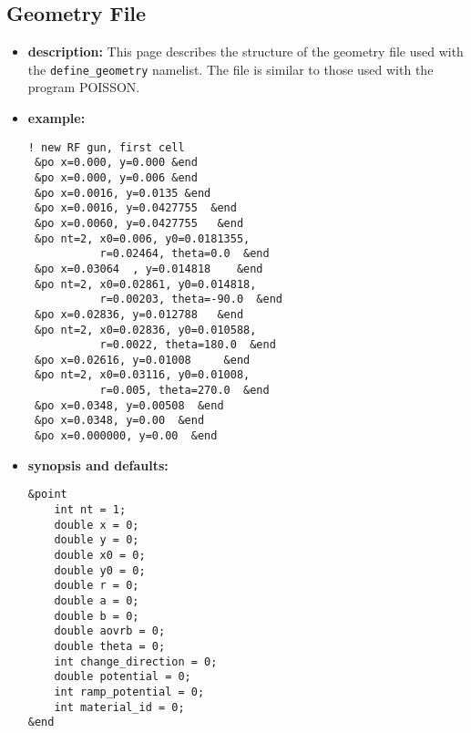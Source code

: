 %
\newpage

\subsection{Geometry File}
\label{geometryFile}

\begin{itemize}

\item {\bf description:}
This page describes the structure of the geometry file used with the
{\tt define\_geometry} namelist.  The file is similar to those used
with the program POISSON.

\item {\bf example:} 
\begin{verbatim}
! new RF gun, first cell
 &po x=0.000, y=0.000 &end
 &po x=0.000, y=0.006 &end
 &po x=0.0016, y=0.0135 &end
 &po x=0.0016, y=0.0427755  &end
 &po x=0.0060, y=0.0427755   &end
 &po nt=2, x0=0.006, y0=0.0181355, 
           r=0.02464, theta=0.0  &end
 &po x=0.03064  , y=0.014818    &end
 &po nt=2, x0=0.02861, y0=0.014818, 
           r=0.00203, theta=-90.0  &end
 &po x=0.02836, y=0.012788   &end
 &po nt=2, x0=0.02836, y0=0.010588, 
           r=0.0022, theta=180.0  &end
 &po x=0.02616, y=0.01008     &end
 &po nt=2, x0=0.03116, y0=0.01008, 
           r=0.005, theta=270.0  &end
 &po x=0.0348, y=0.00508  &end
 &po x=0.0348, y=0.00  &end
 &po x=0.000000, y=0.00  &end
\end{verbatim}

\item {\bf synopsis and defaults:} 
\begin{verbatim}
&point
    int nt = 1;
    double x = 0;
    double y = 0;
    double x0 = 0;
    double y0 = 0;
    double r = 0;
    double a = 0;
    double b = 0;
    double aovrb = 0;
    double theta = 0;
    int change_direction = 0;
    double potential = 0;
    int ramp_potential = 0;
    int material_id = 0;
&end
\end{verbatim}


\end{itemize}
